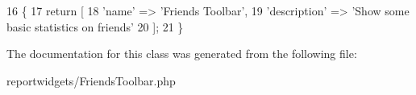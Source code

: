 \begin{DoxyCode}
16     \{
17         \textcolor{keywordflow}{return} [
18             \textcolor{stringliteral}{'name'}        => \textcolor{stringliteral}{'Friends Toolbar'},
19             \textcolor{stringliteral}{'description'} => \textcolor{stringliteral}{'Show some basic statistics on friends'}
20         ];
21     \}
\end{DoxyCode}


The documentation for this class was generated from the following file\-:\begin{DoxyCompactItemize}
\item 
reportwidgets/Friends\-Toolbar.\-php\end{DoxyCompactItemize}
